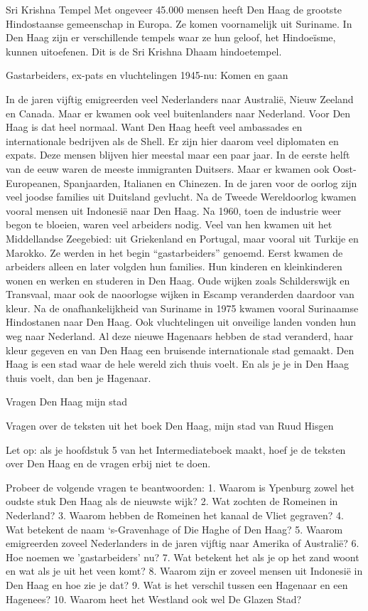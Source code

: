 \documentclass[
  a4paper,
]{book}
\theoremstyle{definition}
\theoremstyle{definition}
\theoremstyle{definition}
\theoremstyle{definition}
\theoremstyle{remark}
\begin{document}
Sri Krishna Tempel
Met ongeveer 45.000 mensen heeft Den Haag de grootste Hindostaanse gemeenschap in Europa. Ze komen voornamelijk uit Suriname. In Den Haag zijn er verschillende tempels waar ze hun geloof, het Hindoeïsme, kunnen uitoefenen. Dit is de Sri Krishna Dhaam hindoetempel.

Gastarbeiders, ex-pats en vluchtelingen
1945-nu: Komen en gaan

In de jaren vijftig emigreerden veel Nederlanders naar Australië, Nieuw Zeeland en Canada.
Maar er kwamen ook veel buitenlanders naar Nederland.
Voor Den Haag is dat heel normaal.
Want Den Haag heeft veel ambassades en internationale bedrijven als de Shell.
Er zijn hier daarom veel diplomaten en expats.
Deze mensen blijven hier meestal maar een paar jaar.
In de eerste helft van de eeuw waren de meeste immigranten Duitsers.
Maar er kwamen ook Oost-Europeanen, Spanjaarden, Italianen en Chinezen.
In de jaren voor de oorlog zijn veel joodse families uit Duitsland gevlucht.
Na de Tweede Wereldoorlog kwamen vooral mensen uit Indonesië naar Den Haag.
Na 1960, toen de industrie weer begon te bloeien, waren veel arbeiders nodig.
Veel van hen kwamen uit het Middellandse Zeegebied: uit Griekenland en Portugal, maar vooral uit Turkije en Marokko.
Ze werden in het begin ``gastarbeiders'' genoemd.
Eerst kwamen de arbeiders alleen en later volgden hun families.
Hun kinderen en kleinkinderen wonen en werken en studeren in Den Haag.
Oude wijken zoals Schilderswijk en Transvaal, maar ook de naoorlogse wijken in Escamp veranderden daardoor van kleur.
Na de onafhankelijkheid van Suriname in 1975 kwamen vooral Surinaamse Hindostanen naar Den Haag.
Ook vluchtelingen uit onveilige landen vonden hun weg naar Nederland.
Al deze nieuwe Hagenaars hebben de stad veranderd, haar kleur gegeven en van Den Haag een bruisende internationale stad gemaakt.
Den Haag is een stad waar de hele wereld zich thuis voelt.
En als je je in Den Haag thuis voelt, dan ben je Hagenaar.

Vragen Den Haag mijn stad

Vragen over de teksten uit het boek Den Haag, mijn stad van Ruud Hisgen

Let op: als je hoofdstuk 5 van het Intermediateboek maakt, hoef je de teksten over Den Haag en de vragen erbij niet te doen.

Probeer de volgende vragen te beantwoorden:
1. Waarom is Ypenburg zowel het oudste stuk Den Haag als de nieuwste wijk?
2. Wat zochten de Romeinen in Nederland?
3. Waarom hebben de Romeinen het kanaal de Vliet gegraven?
4. Wat betekent de naam `s-Gravenhage of Die Haghe of Den Haag?
5. Waarom emigreerden zoveel Nederlanders in de jaren vijftig naar Amerika of Australië?
6. Hoe noemen we 'gastarbeiders' nu?
7. Wat betekent het als je op het zand woont en wat als je uit het veen komt?
8. Waarom zijn er zoveel mensen uit Indonesië in Den Haag en hoe zie je dat?
9. Wat is het verschil tussen een Hagenaar en een Hagenees?
10. Waarom heet het Westland ook wel De Glazen Stad?
\end{document}
